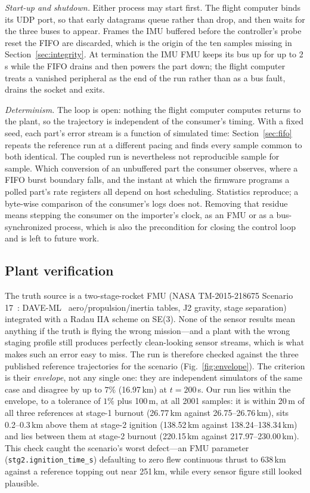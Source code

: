 \documentclass[preprint,12pt,a4paper]{elsarticle}
\newcommand{\code}[1]{\texttt{\small #1}}
\begin{document}
\emph{Start-up and shutdown.} Either process may start first. The flight
computer binds its UDP port, so that early datagrams queue rather than drop,
and then waits for the three buses to appear. Frames the IMU buffered before
the controller's probe reset the FIFO are discarded, which is the origin of the
ten samples missing in Section~\ref{sec:integrity}. At termination the IMU FMU
keeps its bus up for up to 2\,s while the FIFO drains and then powers the part
down; the flight computer treats a vanished peripheral as the end of the run
rather than as a bus fault, drains the socket and exits.

\emph{Determinism.} The loop is open: nothing the flight computer computes
returns to the plant, so the trajectory is independent of the consumer's
timing. With a fixed seed, each part's error stream is a function of simulated
time: Section~\ref{sec:fifo} repeats the reference run at a different pacing
and finds every sample common to both identical. The coupled run is nevertheless not
reproducible sample for sample. Which conversion of an unbuffered part the
consumer observes, where a FIFO burst boundary falls, and the instant at which
the firmware programs a polled part's rate registers all depend on host
scheduling. Statistics reproduce; a byte-wise comparison of the consumer's logs
does not. Removing that residue means stepping the consumer on the importer's
clock, as an FMU or as a bus-synchronized process, which is also the
precondition for closing the control loop and is left to future work.

\subsection{Plant verification}
The truth source is a two-stage-rocket FMU (NASA TM-2015-218675 Scenario
17~\cite{nasa_tm2015}: DAVE-ML~\cite{jackson2011daveml} aero/propulsion/inertia
tables, J2 gravity, stage separation) integrated with a Radau IIA scheme on
SE(3). None of the sensor results mean anything if the truth is flying the wrong
mission---and a plant with the wrong staging profile still produces perfectly
clean-looking sensor streams, which is what makes such an error easy to miss.
The run is therefore checked against the three published reference trajectories
for the scenario (Fig.~\ref{fig:envelope}). The criterion is their
\emph{envelope}, not any single one:
they are independent simulators of the same case and disagree by up to $7\%$
(16.97\,km) at $t=200$\,s. Our run lies within the envelope, to a tolerance of
$1\%$ plus 100\,m, at all 2001 samples: it is within 20\,m of all three
references at stage-1 burnout (26.77\,km against 26.75--26.76\,km), sits
0.2--0.3\,km above them at stage-2 ignition (138.52\,km against
138.24--138.34\,km) and lies between them at stage-2 burnout (220.15\,km against
217.97--230.00\,km). This check caught the
scenario's worst defect---an FMU parameter (\code{stg2.ignition\_time\_s})
defaulting to zero flew continuous thrust to 638\,km against a reference topping
out near 251\,km, while every sensor figure still looked plausible.
\end{document}
